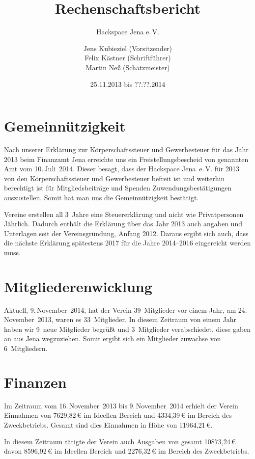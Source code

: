 \documentclass[10pt,DIV16]{scrartcl}
\title{Rechenschaftsbericht}
\subtitle{Hackspace Jena e.\,V.}
\author{%
	Jens Kubieziel (Vorsitzender)\\
    Felix Kästner (Schriftführer)\\
	Martin Neß (Schatzmeister)
}
\date{25.11.2013 bis ??.??.2014}
\begin{document}
\maketitle{}

\tableofcontents{}

\newpage{}

\section{Gemeinnützigkeit}

Nach unserer Erklärung zur Körperschaftssteuer und Gewerbesteuer für das Jahr 2013 beim Finanzamt Jena
erreichte uns ein Freistellungsbescheid von genannten Amt vom 10.\,Juli~2014.
Dieser besagt, dass der Hackspace Jena~e.\,V. für 2013 von den Körperschaftssteuer und Gewerbesteuer befreit ist und weiterhin berechtigt ist für Mitgliedsbeiträge und Spenden Zuwendungsbestätigungen auszustellen.
Somit hat man uns die Gemeinnützigkeit bestätigt.

Vereine erstellen all 3~Jahre eine Steuererklärung und nicht wie Privatpersonen Jährlich.
Dadurch enthält die Erklärung über das Jahr 2013 auch angaben und Unterlagen seit der Vereinsgründung, Anfang 2012.
Daraus ergibt sich auch, dass die nächste Erklärung spätestens 2017 für die Jahre 2014--2016 eingereicht werden muss.

\section{Mitgliederenwicklung}

Aktuell, 9.\,November~2014, hat der Verein 39~Mitglieder vor einem Jahr, am 24.\,November~2013, waren es 33~Mitglieder.
In diesem Zeitraum von einem Jahr haben wir 9~neue Mitglieder begrüßt und 3~Mitglieder verabschiedet, diese gaben an aus Jena wegzuziehen.
Somit ergibt sich ein Mitglieder zuwachse von 6~Mitgliedern.

\section{Finanzen}

Im Zeitraum vom 16.\,November~2013 bis 9.\,November~2014 erhielt der Verein Einnahmen von 7629,82\,\euro{} im Ideellen Bereich und 4334,39\,\euro{} im Bereich des Zweckbetriebs.
Gesamt sind dies Einnahmen in Höhe von 11964,21\,\euro{}.

In diesem Zeitraum tätigte der Verein auch Ausgaben von gesamt 10873,24\,\euro{} davon 8596,92\,\euro{} im Ideellen Bereich und 2276,32\,\euro{} im Bereich des Zweckbetriebs.
\end{document}
